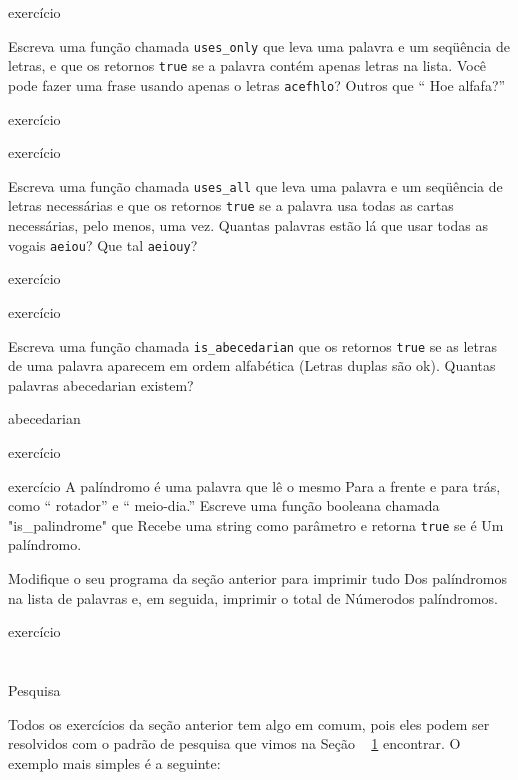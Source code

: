 \documentclass[10pt]{book}
\begin{document}
\begin{} exercício

Escreva uma função chamada \verb "uses_only" que leva uma palavra e um
seqüência de letras, e que os retornos {\tt true} se a palavra contém
apenas letras na lista. Você pode fazer uma frase usando apenas o
letras {\tt acefhlo}? Outros que `` Hoe alfafa?''

\end{} exercício


\begin{} exercício 

Escreva uma função chamada \verb "uses_all" que leva uma palavra e um
seqüência de letras necessárias e que os retornos {\tt true} se a palavra
usa todas as cartas necessárias, pelo menos, uma vez. Quantas palavras estão lá
que usar todas as vogais {\tt aeiou}? Que tal {\tt aeiouy}?

\end{} exercício


\begin{} exercício

Escreva uma função chamada \verb "is_abecedarian" que os retornos
{\tt true} se as letras de uma palavra aparecem em ordem alfabética
(Letras duplas são ok).  
Quantas palavras abecedarian existem?

\index{} abecedarian

\end{} exercício


\begin{} exercício
\label{palíndromo}
A palíndromo é uma palavra que lê o mesmo
Para a frente e para trás, como `` rotador'' e `` meio-dia.''
Escreve uma função booleana chamada \verbo "is_palindrome" que
Recebe uma string como parâmetro e retorna {\tt true} se é
Um palíndromo.

Modifique o seu programa da seção anterior para imprimir tudo
Dos palíndromos na lista de palavras e, em seguida, imprimir o total de
Númerodos palíndromos.
\end{} exercício



\section{} Pesquisa

Todos os exercícios da seção anterior tem algo
em comum, pois eles podem ser resolvidos com o padrão de pesquisa que vimos
na Seção ~ \ref {} encontrar. O exemplo mais simples é a seguinte:
\end{document}
